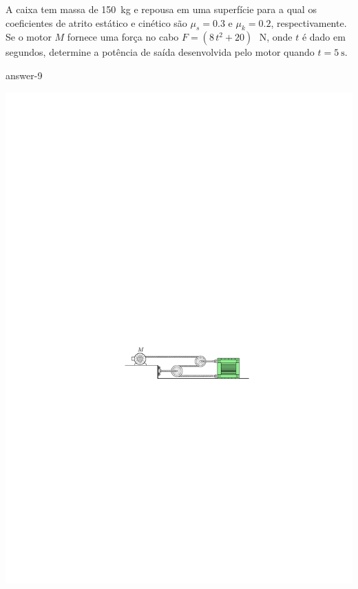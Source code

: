 
\item A caixa tem massa de \SI{150}{\kilogram} e repousa em uma superfície para a qual os coeficientes de atrito estático e cinético são $\mu_{s}=0.3$ e $\mu_{k}=0.2$, respectivamente. Se o motor $M$ fornece uma força no cabo $F=(8\,t^{2}+20)\,$\SI{}{\newton}, onde $t$ é dado em segundos, determine a potência de saída desenvolvida pelo motor quando $t=\SI{5}{\second}$.

{answer-9}

\vspace{7cm}
\begin{flushleft}
    \includegraphics[scale=2]{images/draw_9.pdf}
\end{flushleft}